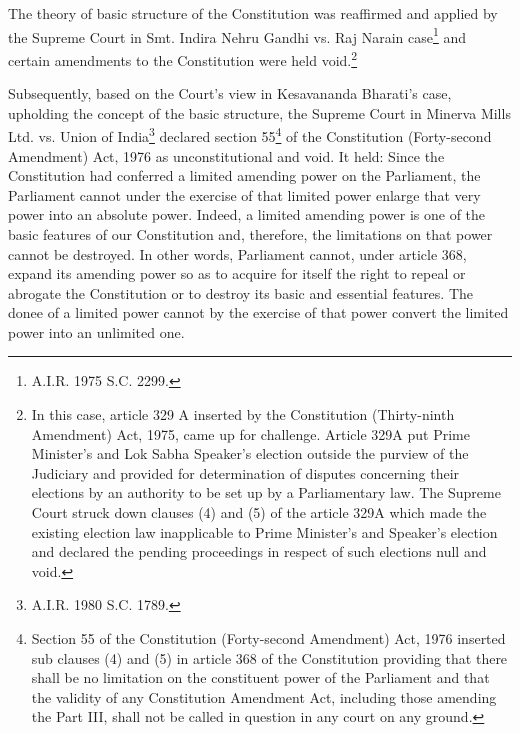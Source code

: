 \begin{multicols}{2}
\vspace{-.15cm}

\noi
The theory of basic structure of the Constitution was reaffirmed and applied by the Supreme
Court in Smt. Indira Nehru Gandhi vs. Raj Narain case\footnote{A.I.R. 1975 S.C. 2299.} and certain amendments to the
Constitution were held void.\footnote{In this case, article 329 A inserted by the Constitution (Thirty-ninth Amendment) Act, 1975, came up for challenge. Article 329A put Prime Minister’s and Lok Sabha Speaker’s election outside the purview of the
Judiciary and provided for determination of disputes concerning their elections by an authority to be set up by a
Parliamentary law. The Supreme Court struck down clauses (4) and (5) of the article 329A which made the
existing election law inapplicable to Prime Minister’s and Speaker’s election and declared the pending
proceedings in respect of such elections null and void.}

\vspace{-.1cm}

\noi
Subsequently, based on the Court’s view in Kesavananda Bharati’s case, upholding the
concept of the basic structure, the Supreme Court in Minerva Mills Ltd. vs. Union of India\footnote{A.I.R. 1980 S.C. 1789.}
declared section 55\footnote{Section 55 of the Constitution (Forty-second Amendment) Act, 1976 inserted sub clauses (4) and (5) in article 368 of the Constitution providing that there shall be no limitation on the constituent power of the Parliament and
that the validity of any Constitution Amendment Act, including those amending the Part III, shall not be called in
question in any court on any ground.} of the Constitution (Forty-second Amendment) Act, 1976 as
unconstitutional and void. It held: Since the Constitution had conferred a limited amending
power on the Parliament, the Parliament cannot under the exercise of that limited power
enlarge that very power into an absolute power. Indeed, a limited amending power is one of
the basic features of our Constitution and, therefore, the limitations on that power cannot be
destroyed. In other words, Parliament cannot, under article 368, expand its amending power
so as to acquire for itself the right to repeal or abrogate the Constitution or to destroy its basic
and essential features. The donee of a limited power cannot by the exercise of that power
convert the limited power into an unlimited one.

\vspace{-.1cm}


\end{multicols}
